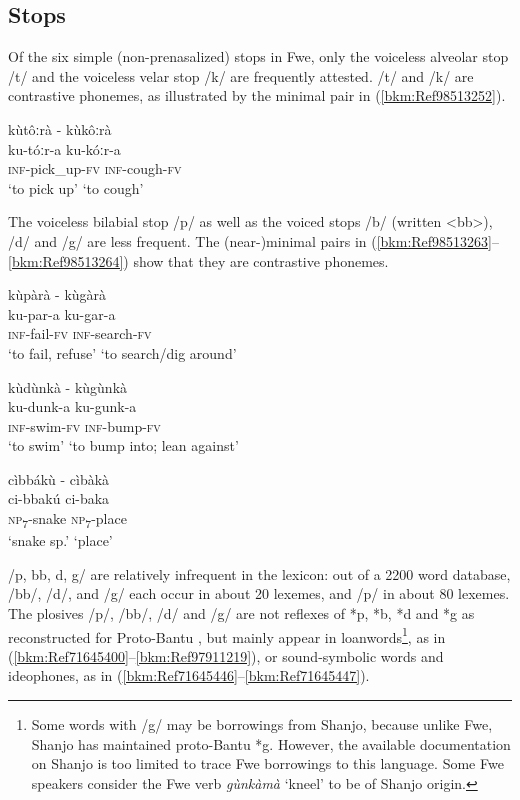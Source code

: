 \subsection{Stops}

Of the six simple (non-prenasalized) stops in Fwe, only the voiceless alveolar stop /t/ and the voice\-less velar stop /k/ are frequently attested. /t/ and /k/ are contrastive phonemes, as illustrated by the minimal pair in (\ref{bkm:Ref98513252}).

\ea
\label{bkm:Ref98513252}
kùtôːrà \tab   - \tab kùkôːrà\\
ku-tóːr-a \tab \tab     ku-kóːr-a\\
\textsc{inf}-pick\_up-\textsc{fv}  \tab \textsc{inf}-cough-\textsc{fv}\\
\glt ‘to pick up’ \tab \tab     ‘to cough’
\z

The voiceless bilabial stop /p/ as well as the voiced stops /b/ (written <bb>), /d/ and /g/ are less frequent. The (near-)minimal pairs in (\ref{bkm:Ref98513263}--\ref{bkm:Ref98513264}) show that they are contrastive phonemes.

\ea
\label{bkm:Ref98513263}
kùpàrà \tab    - \tab  kùgàrà\\
ku-par-a \tab \tab    ku-gar-a\\
\textsc{inf}-fail-\textsc{fv} \tab \tab    \textsc{inf}-search-\textsc{fv}\\
\glt ‘to fail, refuse’ \tab \tab   ‘to search/dig around’
\z

\newpage
\ea
kùdùnkà  \tab - \tab  kùgùnkà\\
ku-dunk-a \tab \tab   ku-gunk-a\\
\textsc{inf}-swim-\textsc{fv} \tab \tab   \textsc{inf}-bump-\textsc{fv}\\
\glt ‘to swim’ \tab \tab    ‘to bump into; lean against’
\z

\ea
\label{bkm:Ref98513264}
cìbbákù  \tab -  \tab cìbàkà\\
ci-bbakú \tab \tab   ci-baka\\
\textsc{np}\textsubscript{7}-snake \tab \tab   \textsc{np}\textsubscript{7}-place\\
\glt ‘snake sp.’ \tab \tab   ‘place’
\z

/p, bb, d, g/ are relatively infrequent in the lexicon: out of a 2200 word database, /bb/, /d/, and /g/ each occur in about 20 lexemes, and /p/ in about 80 lexemes. The plosives /p/, /bb/, /d/ and /g/ are not reflexes of *p, *b, *d and *g as recon\-structed for Proto-Bantu \citep{Bostoen2009}, but mainly appear in loanwords\footnote{Some words with /g/ may be borrowings from Shanjo, because unlike Fwe, Shanjo has maintained proto-Bantu *g. However, the available documentation on Shanjo is too limited to trace Fwe borrowings to this language. Some Fwe speakers consider the Fwe verb \textit{gùnkàmà} ‘kneel’ to be of Shanjo origin.}, as in (\ref{bkm:Ref71645400}--\ref{bkm:Ref97911219}), or sound-symbolic words and ideophones, as in (\ref{bkm:Ref71645446}--\ref{bkm:Ref71645447}).

